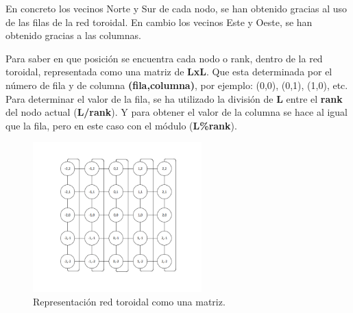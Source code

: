 \documentclass[11pt]{article}
\begin{document}
En concreto los vecinos Norte y Sur de cada nodo, se han obtenido gracias al uso de las filas de la red toroidal. En cambio los vecinos Este y Oeste, se han obtenido gracias a las columnas.

Para saber en que posición se encuentra cada nodo o rank, dentro de la red toroidal, representada como una matriz de \textbf{LxL}. Que esta determinada por el número de fila y de columna \textbf{(fila,columna)}, por ejemplo: (0,0), (0,1), (1,0), etc.
Para determinar el valor de la fila, se ha utilizado la división de \textbf{L} entre el \textbf{rank} del nodo actual (\textbf{L/rank}). Y para obtener el valor de la columna se hace al igual que la fila, pero en este caso con el módulo (\textbf{L\%rank}).

\begin{figure}[H]
  \centering
    \includegraphics[width=65mm]{matriz.png}
  \caption{Representación red toroidal como una matriz.}
  \label{fig:matriz}
\end{figure}
\end{document}
